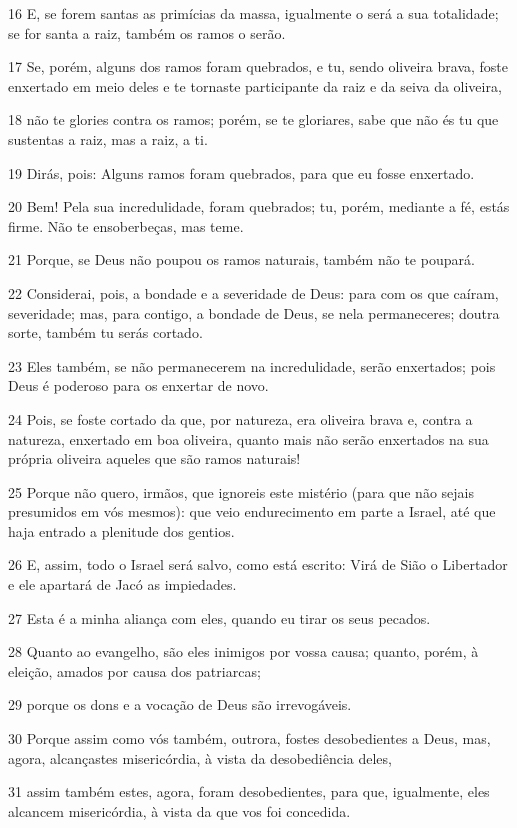 \par 16 E, se forem santas as primícias da massa, igualmente o será a sua totalidade; se for santa a raiz, também os ramos o serão.
\par 17 Se, porém, alguns dos ramos foram quebrados, e tu, sendo oliveira brava, foste enxertado em meio deles e te tornaste participante da raiz e da seiva da oliveira,
\par 18 não te glories contra os ramos; porém, se te gloriares, sabe que não és tu que sustentas a raiz, mas a raiz, a ti.
\par 19 Dirás, pois: Alguns ramos foram quebrados, para que eu fosse enxertado.
\par 20 Bem! Pela sua incredulidade, foram quebrados; tu, porém, mediante a fé, estás firme. Não te ensoberbeças, mas teme.
\par 21 Porque, se Deus não poupou os ramos naturais, também não te poupará.
\par 22 Considerai, pois, a bondade e a severidade de Deus: para com os que caíram, severidade; mas, para contigo, a bondade de Deus, se nela permaneceres; doutra sorte, também tu serás cortado.
\par 23 Eles também, se não permanecerem na incredulidade, serão enxertados; pois Deus é poderoso para os enxertar de novo.
\par 24 Pois, se foste cortado da que, por natureza, era oliveira brava e, contra a natureza, enxertado em boa oliveira, quanto mais não serão enxertados na sua própria oliveira aqueles que são ramos naturais!
\par 25 Porque não quero, irmãos, que ignoreis este mistério (para que não sejais presumidos em vós mesmos): que veio endurecimento em parte a Israel, até que haja entrado a plenitude dos gentios.
\par 26 E, assim, todo o Israel será salvo, como está escrito: Virá de Sião o Libertador e ele apartará de Jacó as impiedades.
\par 27 Esta é a minha aliança com eles, quando eu tirar os seus pecados.
\par 28 Quanto ao evangelho, são eles inimigos por vossa causa; quanto, porém, à eleição, amados por causa dos patriarcas;
\par 29 porque os dons e a vocação de Deus são irrevogáveis.
\par 30 Porque assim como vós também, outrora, fostes desobedientes a Deus, mas, agora, alcançastes misericórdia, à vista da desobediência deles,
\par 31 assim também estes, agora, foram desobedientes, para que, igualmente, eles alcancem misericórdia, à vista da que vos foi concedida.
